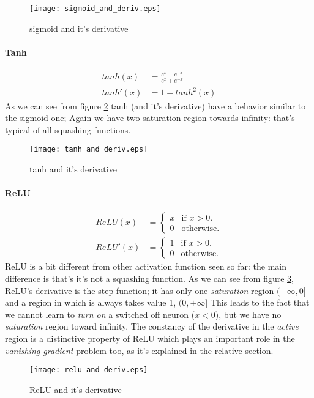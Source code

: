 \begin{figure}[ht]
  \centering
    \texttt{[image: sigmoid\_and\_deriv.eps]}
  \caption{sigmoid and it's derivative}
\label{sigmoid_plot}
\end{figure}

\paragraph{Tanh}
\begin{align}
 tanh(x)&=\frac{e^x-e^{-x}}{e^x+e^{-x}} \\
 tanh'(x)&= 1 - tanh^2(x)  
\end{align}
As we can see from figure \ref{tanh_plot} tanh (and it's derivative) have a behavior similar to the sigmoid one; Again we have two saturation region towards
infinity: that's typical of all squashing functions.



\begin{figure}[ht]
  \centering
    \texttt{[image: tanh\_and\_deriv.eps]}
  \caption{tanh and it's derivative}
\label{tanh_plot}
\end{figure}



\paragraph{ReLU}


\begin{align}
  ReLU(x)&=\begin{cases}
    x & \text{if $x>0$}.\\
    0 & \text{otherwise}.
  \end{cases} \\ 
   ReLU'(x)&=\begin{cases}
    1 & \text{if $x>0$}.\\
    0 & \text{otherwise}.
  \end{cases}
\end{align}
ReLU is a bit different from other activation function seen so far: the main difference is that's it's not a squashing function.
As we can see from figure \ref{relu_plot}, ReLU's derivative is the step function; it has only one \textit{saturation} region $(-\infty, 0]$ and a region in which is always takes value 1, $(0,+\infty]$
This leads to the fact that we cannot learn to \textit{turn on} a switched off neuron ($x<0$), but we have no \textit{saturation} region toward infinity.
The constancy of the derivative in the \textit{active} region is a distinctive property of ReLU which plays an important role in the \textit{vanishing gradient} problem too, as it's explained in the relative
section.

\begin{figure}[ht]
  \centering
    \texttt{[image: relu\_and\_deriv.eps]}
  \caption{ReLU and it's derivative}
\label{relu_plot}
\end{figure}
